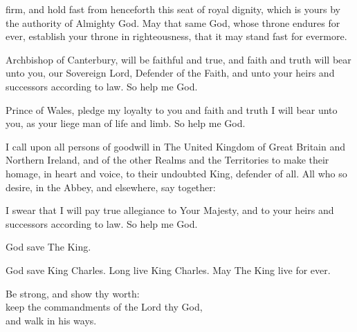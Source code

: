 { firm, and hold fast from henceforth this seat of royal dignity, which
is yours by the authority of Almighty God.
May that same God, whose throne endures for ever, establish your throne
in righteousness, that it may stand fast for evermore.


\vfill 
{}


 Archbishop of Canterbury,
will be faithful and true,
and faith and truth will bear unto you,
our Sovereign Lord, Defender of the Faith, and unto your heirs and
successors according to law.
So help me God.


\vfill 
{}



 Prince of Wales,
pledge my loyalty to you
and faith and truth I will bear unto you,
as your liege man of life and limb.
So help me God.
\vfill 


 I call upon all persons of goodwill in The United Kingdom of Great Britain
and Northern Ireland, and of the other Realms and the Territories to make
their homage, in heart and voice, to their undoubted King, defender of all.
All who so desire, in the Abbey, and elsewhere, say together:


I swear that I will pay true allegiance to Your Majesty,
and to your heirs and successors according to law. So help me God.
\vfill 


\clearpage 
{}
God save The King.


God save King Charles.
Long live King Charles.
May The King live for ever.


\vfill 
{}


\begin{center}
Be strong, and show thy worth:\\ keep the commandments
of the Lord thy God,\\ and walk in his ways.
\end{center}

\vfill 



}
